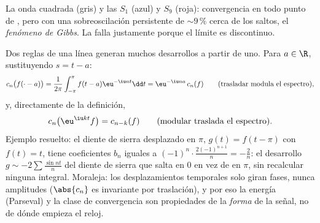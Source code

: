 \begin{omfigure}

{\small La onda cuadrada (gris) y las 
$S_1$ (azul) y $S_9$ (roja): convergencia en todo punto de
, pero con una sobreoscilación persistente de $\sim 9\,\%$
cerca de los saltos, el \emph{fenómeno de Gibbs}. La  falla justamente porque el límite es
discontinuo.}
\end{omfigure}

\begin{example}\label{ex:b2:fourier:shiftrules}
Dos reglas de una línea generan muchos desarrollos a partir de uno.
Para $a \in \R$, sustituyendo $s = t - a$:
\[
c_n\bigl(f(\cdot - a)\bigr)
= \frac{1}{2\pi}\int_{-\pi}^{\pi}f(t - a)\eu^{-\iu nt}\dd t
= \eu^{-\iu na}\,c_n(f)
\qquad\text{(trasladar modula el espectro)},
\]
y, directamente de la definición,
\[
c_n\bigl(\eu^{\iu kt}f\bigr) = c_{n-k}(f)
\qquad\text{(modular traslada el espectro)}.
\]
Ejemplo resuelto: el diente de sierra desplazado en $\pi$, $g(t) =
f(t - \pi)$ con $f(t) = t$, tiene coeficientes $b_n$ iguales a
$(-1)^n\cdot\frac{2(-1)^{n+1}}{n} = -\frac2n$: el desarrollo $g \sim
-2\sum\frac{\sin nt}{n}$ del diente de sierra que salta en $0$ en vez
de en $\pi$, sin recalcular ninguna integral. Moraleja: los
desplazamientos temporales solo giran fases, nunca amplitudes
($\abs{c_n}$ es invariante por traslación), y por eso la energía
(Parseval) y la clase de convergencia son propiedades de la
\emph{forma} de la señal, no de dónde empieza el reloj.
\end{example}


